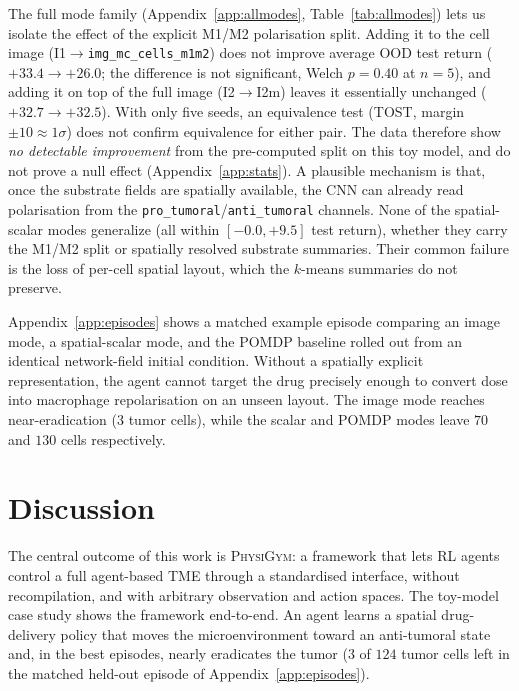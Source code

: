\documentclass{article}
\newcommand{\physigym}{\textsc{PhysiGym}}
\begin{document}
The full mode family (Appendix~\ref{app:allmodes}, Table~\ref{tab:allmodes})
lets us isolate the effect of the explicit M1/M2 polarisation split. Adding it
to the cell image (I1$\to$\texttt{img\_mc\_cells\_m1m2}) does not improve
average OOD test return ($+33.4\to+26.0$; the difference is not significant,
Welch $p=0.40$ at $n=5$), and adding it on top of the full image
(I2$\to$I2m) leaves it essentially unchanged ($+32.7\to+32.5$). With only five
seeds, an equivalence test (TOST, margin $\pm10\approx1\sigma$) does not confirm
equivalence for either pair. The data therefore show \emph{no detectable
improvement} from the pre-computed split on this toy model, and do not prove a
null effect (Appendix~\ref{app:stats}). A plausible mechanism is that, once the
substrate fields are spatially available, the CNN can already read polarisation
from the \texttt{pro\_tumoral}/\texttt{anti\_tumoral} channels. None of the
spatial-scalar modes generalize (all within $[-0.0,+9.5]$ test return), whether
they carry the M1/M2 split or spatially resolved substrate summaries. Their
common failure is the loss of per-cell spatial layout, which the $k$-means
summaries do not preserve.

Appendix~\ref{app:episodes} shows a matched example episode comparing an image
mode, a spatial-scalar mode, and the POMDP baseline rolled out from an identical
network-field initial condition. Without a spatially explicit representation,
the agent cannot target the drug precisely enough to convert dose into
macrophage repolarisation on an unseen layout. The image mode reaches
near-eradication ($3$ tumor cells), while the scalar and POMDP modes leave $70$
and $130$ cells respectively.

\section{Discussion}

The central outcome of this work is \physigym{}: a framework that lets RL agents
control a full agent-based TME through a standardised interface, without
recompilation, and with arbitrary observation and action spaces. The toy-model
case study shows the framework end-to-end. An agent learns a spatial
drug-delivery policy that moves the microenvironment toward an anti-tumoral
state and, in the best episodes, nearly eradicates the tumor
($3$ of $124$ tumor cells left in the matched held-out episode of
Appendix~\ref{app:episodes}).
\end{document}
